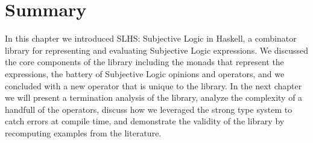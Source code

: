 \documentclass[thesis.tex]{subfiles}
\begin{document}
\section{Summary}

In this chapter we introduced SLHS: Subjective Logic in Haskell, a combinator library
for representing and evaluating Subjective Logic expressions. We discussed the core
components of the library including the monads that represent the expressions, the
battery of Subjective Logic opinions and operators, and we concluded with a new operator
that is unique to the library. In the next chapter we will present a termination
analysis of the library, analyze the complexity of a handfull of the operators, discuss
how we leveraged the strong type system to catch errors at compile time, and demonstrate
the validity of the library by recomputing examples from the literature.



%
%


%
%
\end{document}
